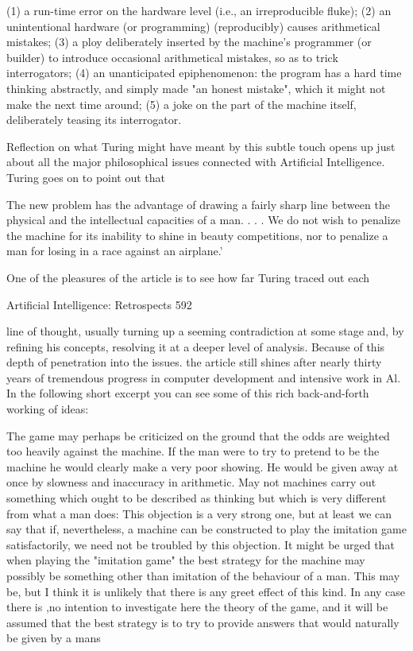 {       (1) a run-time error on the hardware level (i.e., an irreproducible fluke);
       (2) an unintentional hardware (or programming) (reproducibly) causes
       arithmetical mistakes;
       (3) a ploy deliberately inserted by the machine's programmer (or builder) to
       introduce occasional arithmetical mistakes, so as to trick interrogators;
       (4) an unanticipated epiphenomenon: the program has a hard time thinking
       abstractly, and simply made "an honest mistake", which it might not make the
       next time around;
       (5) a joke on the part of the machine itself, deliberately teasing its interrogator.

Reflection on what Turing might have meant by this subtle touch opens up just about all
the major philosophical issues connected with Artificial Intelligence.
       Turing goes on to point out that

   The new problem has the advantage of drawing a fairly sharp line between the
   physical and the intellectual capacities of a man. . . . We do not wish to
   penalize the machine for its inability to shine in beauty competitions, nor to
   penalize a man for losing in a race against an airplane.'

One of the pleasures of the article is to see how far Turing traced out each



Artificial Intelligence: Retrospects                                                   592

line of thought, usually turning up a seeming contradiction at some stage and, by refining
his concepts, resolving it at a deeper level of analysis. Because of this depth of
penetration into the issues. the article still shines after nearly thirty years of tremendous
progress in computer development and intensive work in Al. In the following short
excerpt you can see some of this rich back-and-forth working of ideas:

   The game may perhaps be criticized on the ground that the odds are weighted too
   heavily against the machine. If the man were to try to pretend to be the machine he
   would clearly make a very poor showing. He would be given away at once by
   slowness and inaccuracy in arithmetic. May not machines carry out something
   which ought to be described as thinking but which is very different from what a
   man does: This objection is a very strong one, but at least we can say that if,
   nevertheless, a machine can be constructed to play the imitation game satisfactorily,
   we need not be troubled by this objection.
           It might be urged that when playing the "imitation game" the best strategy
   for the machine may possibly be something other than imitation of the behaviour of
   a man. This may be, but I think it is unlikely that there is any greet effect of this
   kind. In any case there is ,no intention to investigate here the theory of the game,
   and it will be assumed that the best strategy is to try to provide answers that would
   naturally be given by a mans

}
